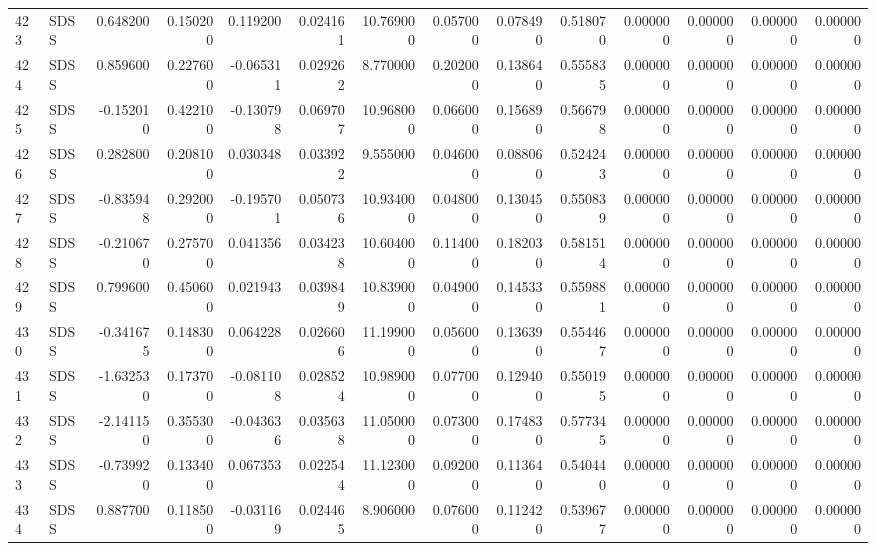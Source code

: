 \begin{tabular}{llrrrrrrrrrrrr}
423 &   SDSS &  0.648200 &      0.150200 &  0.119200 &    0.024161 &  10.769000 &      0.057000 &   0.078490 &  0.518070 &  0.000000 &   0.000000 &     0.000000 &     0.000000 \\
424 &   SDSS &  0.859600 &      0.227600 & -0.065311 &    0.029262 &   8.770000 &      0.202000 &   0.138640 &  0.555835 &  0.000000 &   0.000000 &     0.000000 &     0.000000 \\
425 &   SDSS & -0.152010 &      0.422100 & -0.130798 &    0.069707 &  10.968000 &      0.066000 &   0.156890 &  0.566798 &  0.000000 &   0.000000 &     0.000000 &     0.000000 \\
426 &   SDSS &  0.282800 &      0.208100 &  0.030348 &    0.033922 &   9.555000 &      0.046000 &   0.088060 &  0.524243 &  0.000000 &   0.000000 &     0.000000 &     0.000000 \\
427 &   SDSS & -0.835948 &      0.292000 & -0.195701 &    0.050736 &  10.934000 &      0.048000 &   0.130450 &  0.550839 &  0.000000 &   0.000000 &     0.000000 &     0.000000 \\
428 &   SDSS & -0.210670 &      0.275700 &  0.041356 &    0.034238 &  10.604000 &      0.114000 &   0.182030 &  0.581514 &  0.000000 &   0.000000 &     0.000000 &     0.000000 \\
429 &   SDSS &  0.799600 &      0.450600 &  0.021943 &    0.039849 &  10.839000 &      0.049000 &   0.145330 &  0.559881 &  0.000000 &   0.000000 &     0.000000 &     0.000000 \\
430 &   SDSS & -0.341675 &      0.148300 &  0.064228 &    0.026606 &  11.199000 &      0.056000 &   0.136390 &  0.554467 &  0.000000 &   0.000000 &     0.000000 &     0.000000 \\
431 &   SDSS & -1.632530 &      0.173700 & -0.081108 &    0.028524 &  10.989000 &      0.077000 &   0.129400 &  0.550195 &  0.000000 &   0.000000 &     0.000000 &     0.000000 \\
432 &   SDSS & -2.141150 &      0.355300 & -0.043636 &    0.035638 &  11.050000 &      0.073000 &   0.174830 &  0.577345 &  0.000000 &   0.000000 &     0.000000 &     0.000000 \\
433 &   SDSS & -0.739920 &      0.133400 &  0.067353 &    0.022544 &  11.123000 &      0.092000 &   0.113640 &  0.540440 &  0.000000 &   0.000000 &     0.000000 &     0.000000 \\
434 &   SDSS &  0.887700 &      0.118500 & -0.031169 &    0.024465 &   8.906000 &      0.076000 &   0.112420 &  0.539677 &  0.000000 &   0.000000 &     0.000000 &     0.000000 \\

\end{tabular}
